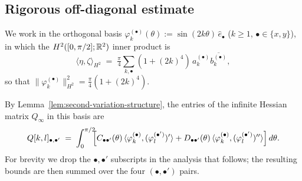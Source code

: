 %
%
%
%
%
%
%

\subsection{Rigorous off-diagonal estimate}\label{sec:offdiag-rigorous}

We work in the orthogonal basis
$\varphi_{k}^{(\bullet)}(\theta) := \sin(2k\theta)\,\hat{e}_{\bullet}$
($k \geq 1$, $\bullet \in \{x,y\}$), in which the
$H^{2}([0,\pi/2];\mathbb{R}^{2})$ inner product is
\begin{equation}\label{eq:H2-norm-tail}
   \langle \eta, \zeta \rangle_{H^{2}}
      \;=\; \tfrac{\pi}{4}\sum_{k,\bullet}
            (1 + (2k)^{4})\,a_{k}^{(\bullet)} \overline{b_{k}^{(\bullet)}},
\end{equation}
so that $\|\varphi_{k}^{(\bullet)}\|_{H^{2}}^{2} = \tfrac{\pi}{4}(1+(2k)^{4})$.

By Lemma~\ref{lem:second-variation-structure}, the entries of the
infinite Hessian matrix $Q_{\infty}$ in this basis are
\begin{equation}\label{eq:Qkl-def-rig}
  Q[k,l]_{\bullet,\bullet'}
   \;=\;
   \int_{0}^{\pi/2}\!\!\Bigl[
        C_{\bullet\bullet'}(\theta)\,
        \langle \varphi_{k}^{(\bullet)}, (\varphi_{l}^{(\bullet')})'\rangle
        + D_{\bullet\bullet'}(\theta)\,
        \langle \varphi_{k}^{(\bullet)}, (\varphi_{l}^{(\bullet')})''\rangle
   \Bigr]\,d\theta.
\end{equation}
For brevity we drop the $\bullet,\bullet'$ subscripts in the analysis
that follows; the resulting bounds are then summed over the four
$(\bullet,\bullet')$ pairs.

